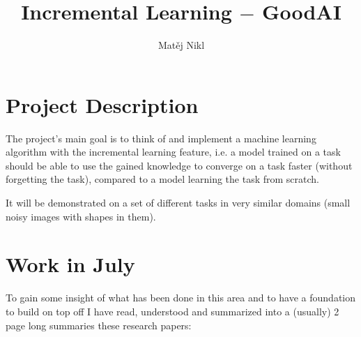 \documentclass[a4paper]{article}
\title{Incremental Learning $-$ GoodAI}
\author{Matěj Nikl}
\begin{document}
\maketitle


\section{Project Description}
The project's main goal is to think of and implement a machine learning
algorithm with the incremental learning feature, i.e. a model trained on a 
task should be able to use the gained knowledge to converge on a  task faster
(without forgetting the  task), compared to a model learning the 
task from scratch.

It will be demonstrated on a set of different tasks in very similar domains
(small noisy images with shapes in them).

\section{Work in July}
To gain some insight of what has been done in this area and to have a foundation
to build on top off I have read, understood and summarized into a (usually)
2 page long summaries these research papers:
\end{document}
